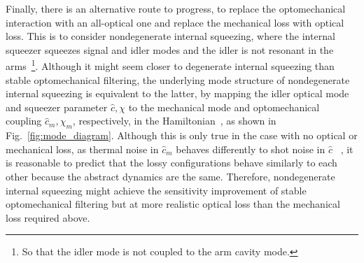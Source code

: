 Finally, there is an alternative route to progress, to replace the optomechanical interaction with an all-optical one and replace the mechanical loss with optical loss. This is to consider nondegenerate internal squeezing, where the internal squeezer squeezes signal and idler modes and the idler is not resonant in the arms~\footnote{So that the idler mode is not coupled to the arm cavity mode.}. 
Although it might seem closer to degenerate internal squeezing than stable optomechanical filtering, the underlying mode structure of nondegenerate internal squeezing is equivalent to the latter, by mapping the idler optical mode and squeezer parameter $\hat c, \chi$ to the mechanical mode and optomechanical coupling $\hat{c}_m, \chi_m$, respectively, in the Hamiltonian~\cite{}, as shown in Fig.~\ref{fig:mode_diagram}. Although this is only true in the case with no optical or mechanical loss, as thermal noise in $\hat{c}_m$ behaves differently to shot noise in $\hat c$~\cite{} , it is reasonable to predict that the lossy configurations behave similarly to each other because the abstract dynamics are the same. Therefore, nondegenerate internal squeezing might achieve the sensitivity improvement of stable optomechanical filtering but at more realistic optical loss than the mechanical loss required above.



